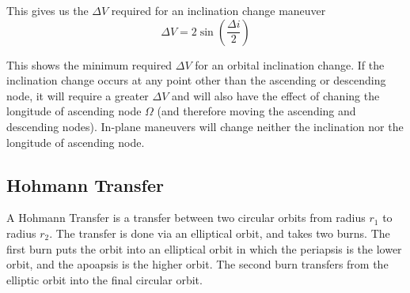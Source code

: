 \documentclass[../basicOrbitalDynamics.tex]{subfiles}
\begin{document}
This gives us the $\Delta V$ required for an inclination change maneuver
\begin{equation}
    \Delta V= 2\sin\left(\frac{\Delta i}{2}\right)
\end{equation}

This shows the minimum required $\Delta V$ for an orbital inclination change. If the inclination change occurs at any point other than the ascending or descending node, it will require a greater $\Delta V$ and will also have the effect of chaning the longitude of ascending node $\Omega$ (and therefore moving the ascending and descending nodes). In-plane maneuvers will change neither the inclination nor the longitude of ascending node.

\bigskip\bigskip
\subsection{Hohmann Transfer}\label{sec:Hohmann Transfer}

A Hohmann Transfer is a transfer between two circular orbits from radius $r_1$ to radius $r_2$. The transfer is done via an elliptical orbit, and takes two burns. The first burn puts the orbit into an elliptical orbit in which the periapsis is the lower orbit, and the apoapsis is the higher orbit. The second burn transfers from the elliptic orbit into the final circular orbit.
\end{document}
